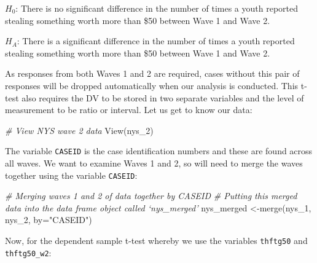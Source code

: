\documentclass[
]{book}
\newenvironment{Shaded}{\begin{snugshade}}{\end{snugshade}}
\newcommand{\AttributeTok}[1]{\textcolor[rgb]{0.77,0.63,0.00}{#1}}
\newcommand{\CommentTok}[1]{\textcolor[rgb]{0.56,0.35,0.01}{\textit{#1}}}
\newcommand{\ConstantTok}[1]{\textcolor[rgb]{0.00,0.00,0.00}{#1}}
\newcommand{\FunctionTok}[1]{\textcolor[rgb]{0.00,0.00,0.00}{#1}}
\newcommand{\NormalTok}[1]{#1}
\newcommand{\OtherTok}[1]{\textcolor[rgb]{0.56,0.35,0.01}{#1}}
\newcommand{\SpecialCharTok}[1]{\textcolor[rgb]{0.00,0.00,0.00}{#1}}
\newcommand{\StringTok}[1]{\textcolor[rgb]{0.31,0.60,0.02}{#1}}
\begin{document}
\(H_0\): There is no significant difference in the number of times a youth reported stealing something worth more than \$50 between Wave 1 and Wave 2.

\(H_A\): There is a significant difference in the number of times a youth reported stealing something worth more than \$50 between Wave 1 and Wave 2.

As responses from both Waves 1 and 2 are required, cases without this pair of responses will be dropped automatically when our analysis is conducted. This t-test also requires the DV to be stored in two separate variables and the level of measurement to be ratio or interval. Let us get to know our data:

\begin{Shaded}
\begin{Highlighting}[]
\CommentTok{\# View NYS wave 2 data }
\FunctionTok{View}\NormalTok{(nys\_2)}
\end{Highlighting}
\end{Shaded}

The variable \texttt{CASEID} is the case identification numbers and these are found across all waves. We want to examine Waves 1 and 2, so will need to merge the waves together using the variable \texttt{CASEID}:

\begin{Shaded}
\begin{Highlighting}[]
\CommentTok{\# Merging waves 1 and 2 of data together by CASEID}
\CommentTok{\# Putting this merged data into the data frame object called ‘nys\_merged’}
\NormalTok{nys\_merged }\OtherTok{\textless{}{-}}\FunctionTok{merge}\NormalTok{(nys\_1, nys\_2, }\AttributeTok{by=}\StringTok{"CASEID"}\NormalTok{)}
\end{Highlighting}
\end{Shaded}

Now, for the dependent sample t-test whereby we use the variables \texttt{thftg50} and \texttt{thftg50\_w2}:

\begin{Shaded}
\end{Shaded}
\end{document}
